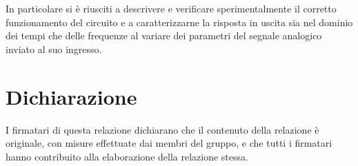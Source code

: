 \documentclass[10pt, a4paper, italian]{article}
\begin{document}
In particolare si è riusciti a descrivere e verificare sperimentalmente il
corretto funzionamento del circuito e a caratterizzarne la risposta in uscita
sia nel dominio dei tempi che delle frequenze al variare dei parametri del
segnale analogico inviato al suo ingresso.

\section*{Dichiarazione}
I firmatari di questa relazione dichiarano che il contenuto della relazione \`e
originale, con misure effettuate dai membri del gruppo, e che tutti i firmatari
hanno contribuito alla elaborazione della relazione stessa.
\end{document}
